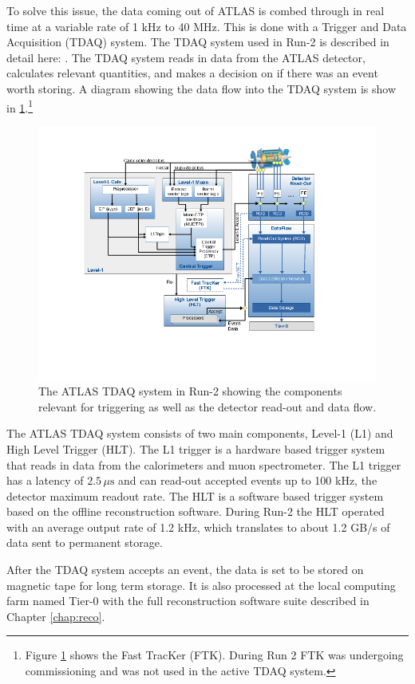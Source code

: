 	To solve this issue, the data coming out of ATLAS is combed through in real time at a variable rate of 1 kHz to 40 MHz. This is done with a Trigger and Data Acquisition (TDAQ) system. The TDAQ system used in Run-2 is described in detail here: \cite{ATLAS-trigger-Run2}. The TDAQ system reads in data from the ATLAS detector, calculates relevant quantities, and makes a decision on if there was an event worth storing. A diagram showing the data flow into the TDAQ system is show in \ref{fig:trigger-run2}.\footnote{Figure \ref{fig:trigger-run2} shows the Fast TracKer (FTK). During Run 2 FTK was undergoing commissioning and was not used in the active TDAQ system.} 
	\begin{figure}[!ht]
	\centering
	\includegraphics[width=\textwidth,keepaspectratio=true]{chapters/chapter2_experiment/images/Trigger_Run2.png}
	\caption{The ATLAS TDAQ system in Run-2 showing the components relevant for triggering as well as the detector read-out and data flow.}
	\label{fig:trigger-run2}
	\end{figure}
	The ATLAS TDAQ system consists of two main components, Level-1 (L1) and High Level Trigger (HLT). The L1 trigger is a hardware based trigger system that reads in data from the calorimeters and muon spectrometer. The L1 trigger has a latency of $2.5 \, \mu \mathrm{s}$ and can read-out accepted events up to 100 kHz, the detector maximum readout rate. The HLT is a software based trigger system based on the offline reconstruction software. During Run-2 the HLT operated with an average output rate of 1.2 kHz, which translates to about 1.2 GB/s of data sent to permanent storage.	

	After the TDAQ system accepts an event, the data is set to be stored on magnetic tape for long term storage. It is also processed at the local computing farm named Tier-0 with the full reconstruction software suite described in Chapter \ref{chap:reco}.

